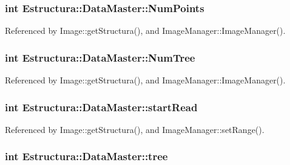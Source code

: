 \subsubsection[{\texorpdfstring{Num\+Points}{NumPoints}}]{\setlength{\rightskip}{0pt plus 5cm}int Estructura\+::\+Data\+Master\+::\+Num\+Points}\hypertarget{structEstructura_1_1DataMaster_ad62760f62256a3fbd88481f720b81851}{}\label{structEstructura_1_1DataMaster_ad62760f62256a3fbd88481f720b81851}


Referenced by Image\+::get\+Structura(), and Image\+Manager\+::\+Image\+Manager().

\subsubsection[{\texorpdfstring{Num\+Tree}{NumTree}}]{\setlength{\rightskip}{0pt plus 5cm}int Estructura\+::\+Data\+Master\+::\+Num\+Tree}\hypertarget{structEstructura_1_1DataMaster_a950938f474870649fe7eceae940366fd}{}\label{structEstructura_1_1DataMaster_a950938f474870649fe7eceae940366fd}


Referenced by Image\+::get\+Structura(), and Image\+Manager\+::\+Image\+Manager().

\subsubsection[{\texorpdfstring{start\+Read}{startRead}}]{\setlength{\rightskip}{0pt plus 5cm}int Estructura\+::\+Data\+Master\+::start\+Read}\hypertarget{structEstructura_1_1DataMaster_ada49eb1401a3715858043ebd2b61c10c}{}\label{structEstructura_1_1DataMaster_ada49eb1401a3715858043ebd2b61c10c}


Referenced by Image\+::get\+Structura(), and Image\+Manager\+::set\+Range().

\subsubsection[{\texorpdfstring{tree}{tree}}]{\setlength{\rightskip}{0pt plus 5cm}int Estructura\+::\+Data\+Master\+::tree}\hypertarget{structEstructura_1_1DataMaster_a766b1b437e0f242d3626a3759bef8b43}{}\label{structEstructura_1_1DataMaster_a766b1b437e0f242d3626a3759bef8b43}


